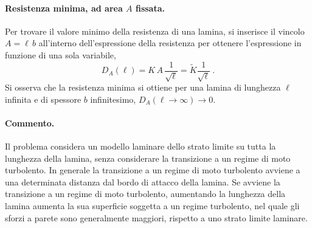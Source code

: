 \paragraph{Resistenza minima, ad area $A$ fissata.}
Per trovare il valore minimo della resistenza di una lamina, si inserisce il vincolo $A = \ell \, b $ all'interno dell'espressione della resistenza per ottenere l'espressione in funzione di una sola variabile,
\begin{equation}
    D_A(\ell) = K \, A \, \dfrac{1}{\sqrt{\ell}} = \tilde{K} \dfrac{1}{\sqrt{\ell}} \ .
\end{equation}
Si osserva che la resistenza minima si ottiene per una lamina di lunghezza $\ell$ infinita e di spessore $b$ infinitesimo, $D_A(\ell \rightarrow \infty) \rightarrow 0$.

\paragraph{Commento.}
Il problema considera un modello laminare dello strato limite su tutta la lunghezza della lamina, senza considerare la transizione a un regime di moto turbolento. In generale la transizione a un regime di moto turbolento avviene a una determinata distanza dal bordo di attacco della lamina. Se avviene la transizione a un regime di moto turbolento, aumentando la lunghezza della lamina aumenta la sua superficie soggetta a un regime turbolento, nel quale gli sforzi a parete sono generalmente maggiori, rispetto a uno strato limite laminare.
